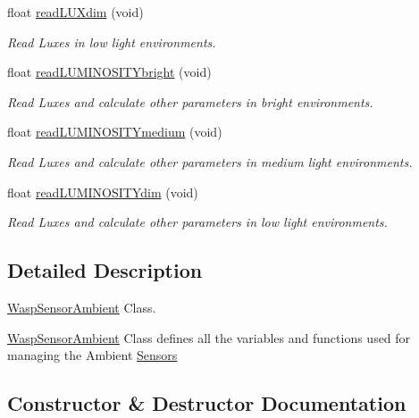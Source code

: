 \begin{DoxyCompactItemize}
float \hyperlink{class_wasp_sensor_ambient_ac40761911a72febe1540b77b685f7274}{read\+L\+U\+Xdim} (void)
\begin{DoxyCompactList}\small\item\em Read Luxes in low light environments. \end{DoxyCompactList}\item 
float \hyperlink{class_wasp_sensor_ambient_ab2d86e3e340a7542dea388140bf23f13}{read\+L\+U\+M\+I\+N\+O\+S\+I\+T\+Ybright} (void)
\begin{DoxyCompactList}\small\item\em Read Luxes and calculate other parameters in bright environments. \end{DoxyCompactList}\item 
float \hyperlink{class_wasp_sensor_ambient_aaa9be4682cd98f45d733db3a284d4b47}{read\+L\+U\+M\+I\+N\+O\+S\+I\+T\+Ymedium} (void)
\begin{DoxyCompactList}\small\item\em Read Luxes and calculate other parameters in medium light environments. \end{DoxyCompactList}\item 
float \hyperlink{class_wasp_sensor_ambient_acb02d4d25453b784076368f72a78385d}{read\+L\+U\+M\+I\+N\+O\+S\+I\+T\+Ydim} (void)
\begin{DoxyCompactList}\small\item\em Read Luxes and calculate other parameters in low light environments. \end{DoxyCompactList}\end{DoxyCompactItemize}


\subsection{Detailed Description}
\hyperlink{class_wasp_sensor_ambient}{Wasp\+Sensor\+Ambient} Class. 

\hyperlink{class_wasp_sensor_ambient}{Wasp\+Sensor\+Ambient} Class defines all the variables and functions used for managing the Ambient \hyperlink{class_sensors}{Sensors} 

\subsection{Constructor \& Destructor Documentation}
